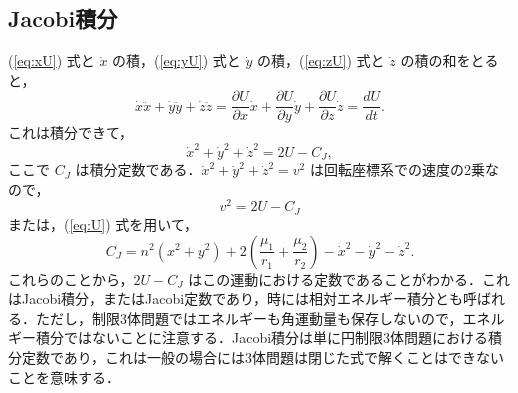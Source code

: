 \documentclass[11pt,a4paper,oneside,onecolumn]{jarticle}
\begin{document}
\subsection{Jacobi積分}
(\ref{eq:xU}) 式と $\dot{x}$ の積，(\ref{eq:yU}) 式と $\dot{y}$ の積，(\ref{eq:zU}) 式と $\dot{z}$ の積の和をとると，
\begin{equation}
\dot{x} \ddot{x} + \dot{y} \ddot{y} + \dot{z} \ddot{z} = \frac{\partial U}{\partial x} \dot{x} + \frac{\partial U}{\partial y} \dot{y} + \frac{\partial U}{\partial z} \dot{z} = \frac{dU}{dt}.
\end{equation}
これは積分できて，
\begin{equation}
\dot{x}^2 + \dot{y}^2 + \dot{z}^2 = 2 U - C_J, \label{eq:2U-C_J}
\end{equation}
ここで $C_J$ は積分定数である．$\dot{x}^2 + \dot{y}^2 + \dot{z}^2 = v^2$ は回転座標系での速度の2乗なので，
\begin{equation}
v^2 = 2 U - C_J
\end{equation}
または，(\ref{eq:U}) 式を用いて，
\begin{equation}
C_J = n^2 (x^2 + y^2) + 2 \left( \frac{\mu_1}{r_1} + \frac{\mu_2}{r_2} \right) - \dot{x}^2 - \dot{y}^2 - \dot{z}^2.
\end{equation}
これらのことから，$2 U - C_J$ はこの運動における定数であることがわかる．これはJacobi積分，またはJacobi定数であり，時には相対エネルギー積分とも呼ばれる．ただし，制限3体問題ではエネルギーも角運動量も保存しないので，エネルギー積分ではないことに注意する．Jacobi積分は単に円制限3体問題における積分定数であり，これは一般の場合には3体問題は閉じた式で解くことはできないことを意味する．
\end{document}
